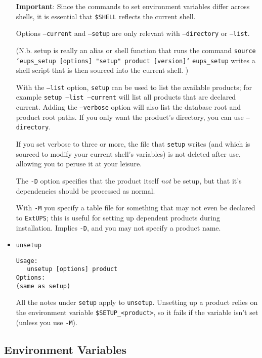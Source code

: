\documentclass{article}
\newcommand{\code}[1]{\texttt{#1}}
\newcommand{\eups}{\code{ExtUPS}}
\begin{document}
\begin{itemize}
\textbf{Important}: Since the commands to set environment variables differ across shells,
it is essential that \code{\$SHELL} reflects the current shell.

Options \code{--current} and \code{--setup} are only relevant with \code{--directory}
or \code{--list}.

(N.b. setup is really an alias or shell function that runs the command\hfil\break
\code{source `eups\_setup [options] "setup" product [version]`}\hfil\break
\code{eups\_setup} writes a shell script that is then sourced into the
current shell.
)

With the \code{--list} option, \code{setup} can be used to list the available
products; for example \code{setup --list --current} will list all products that
are declared current. Adding the \code{--verbose} option will also
list the database root and product root paths.  If you only want the product's
directory, you can use \code{--directory}.

If you set verbose to three or more, the file that \code{setup} writes (and
which is sourced to modify your current shell's variables) is not deleted
after use, allowing you to peruse it at your leisure.

The \code{-D} option specifies that the product itself \textit{not} be
setup, but that it's dependencies should be processed as normal.

With \code{-M} you specify a table file for something that may not
even be declared to \eups{}; this is useful for setting up dependent
products during installation.  Implies \code{-D}, and you may not
specify a product name.


\item \code{unsetup}
\begin{verbatim}
Usage:
   unsetup [options] product
Options:
(same as setup)
\end{verbatim}
  
All the notes under \code{setup} apply to
\code{unsetup}. Unsetting up a product relies on the environment
variable \code{\$SETUP\_<product>}, so it fails if the variable
isn't set (unless you use \code{-M}).

\end{itemize}

\subsection{Environment Variables}
\end{document}
